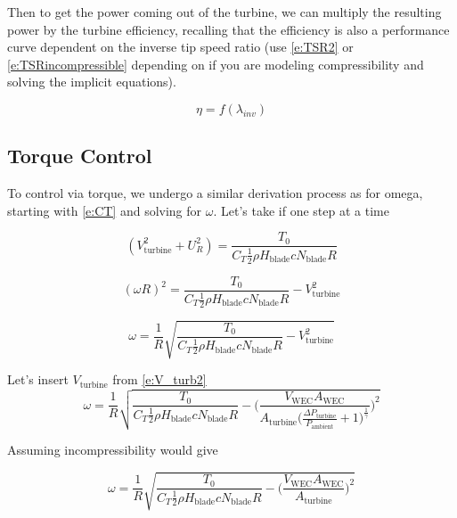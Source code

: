 \documentclass[conf]{new-aiaa}
\begin{document}
 Then to get the power coming out of the turbine, we can multiply the resulting power by the turbine efficiency, recalling that the efficiency is also a performance curve dependent on the inverse tip speed ratio (use \cref{e:TSR2} or \cref{e:TSRincompressible} depending on if you are modeling compressibility and solving the implicit equations).
 
     \begin{equation}
\label{e:CA2}
\eta = f(\lambda_{inv})
\end{equation}

\subsection{Torque Control}

To control via torque, we undergo a similar derivation process as for omega, starting with \cref{e:CT} and solving for $\omega$.  Let's take if one step at a time

    \begin{equation}
\label{e:CT1}
(V_\text{turbine}^2 + U_R^2) = \frac{T_0} { C_T \frac{1}{2}\rho H_\text{blade} c N_\text{blade} R}
\end{equation}

    \begin{equation}
\label{e:CT1}
(\omega R)^2 = \frac{T_0} { C_T \frac{1}{2}\rho H_\text{blade} c N_\text{blade} R} - V_\text{turbine}^2 
\end{equation}

    \begin{equation}
\label{e:CT1}
\omega = \frac{1}{R} \sqrt{\frac{T_0} { C_T \frac{1}{2}\rho H_\text{blade} c N_\text{blade} R} - V_\text{turbine}^2 }
\end{equation}

Let's insert $V_\text{turbine}$ from \cref{e:V_turb2}
    \begin{equation}
\label{e:CT1}
\omega = \frac{1}{R} \sqrt{\frac{T_0} { C_T \frac{1}{2}\rho H_\text{blade} c N_\text{blade} R} - \Bigg(  \frac{V_\text{WEC} A_\text{WEC}} {A_\text{turbine} \bigg(\frac{\Delta P_\text{turbine} }{P_\text{ambient} } + 1\bigg)^\frac{1}{\gamma}} \Bigg)^2 }
\end{equation}

Assuming incompressibility would give

    \begin{equation}
\label{e:CT2}
\omega = \frac{1}{R} \sqrt{\frac{T_0} { C_T \frac{1}{2}\rho H_\text{blade} c N_\text{blade} R} - \Bigg(  \frac{V_\text{WEC} A_\text{WEC}} {A_\text{turbine} } \Bigg)^2 }
\end{equation}
\end{document}
